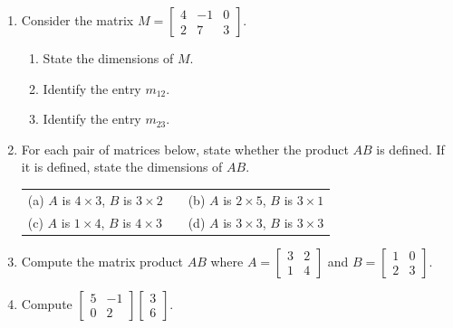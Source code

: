 \documentclass[10pt]{article}
\begin{document}

\vspace{0.12in}

\begin{enumerate}[leftmargin=1.6em, itemsep=14pt]

\item Consider the matrix $M = \begin{bmatrix}4 & -1 & 0 \\ 2 & 7 & 3\end{bmatrix}$.
\begin{enumerate}[label=(\alph*), itemsep=6pt]
  \item State the dimensions of $M$.
  \item Identify the entry $m_{12}$.
  \item Identify the entry $m_{23}$.
\end{enumerate}

\vspace{0.8in}

\item For each pair of matrices below, state whether the product $AB$ is defined.
If it is defined, state the dimensions of $AB$.

\medskip
\begin{tabular}{@{}lll@{}}
  (a) $A$ is $4\times 3$, $B$ is $3\times 2$ &\qquad&
  (b) $A$ is $2\times 5$, $B$ is $3\times 1$ \\[4pt]
  (c) $A$ is $1\times 4$, $B$ is $4\times 3$ &&
  (d) $A$ is $3\times 3$, $B$ is $3\times 3$
\end{tabular}

\vspace{1.0in}

\item Compute the matrix product $AB$ where
$A = \begin{bmatrix}3 & 2 \\ 1 & 4\end{bmatrix}$ and
$B = \begin{bmatrix}1 & 0 \\ 2 & 3\end{bmatrix}$.

\vspace{1.8in}

\item Compute
$\begin{bmatrix}5 & -1 \\ 0 & 2\end{bmatrix}\begin{bmatrix}3 \\ 6\end{bmatrix}$.


\end{enumerate}
\end{document}
